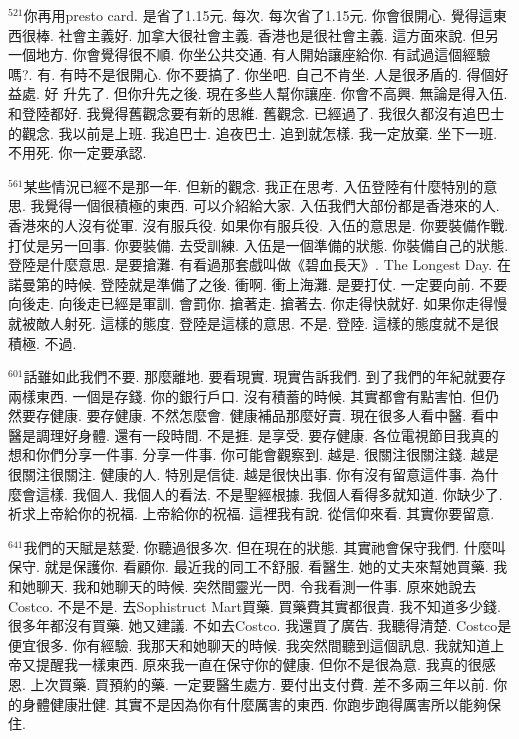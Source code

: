 \documentclass{book}
\begin{document}
$^{521}$你再用presto card.
是省了1.15元.
每次.
每次省了1.15元.
你會很開心.
覺得這東西很棒.
社會主義好.
加拿大很社會主義.
香港也是很社會主義.
這方面來說.
但另一個地方.
你會覺得很不順.
你坐公共交通.
有人開始讓座給你.
有試過這個經驗嗎?.
有.
有時不是很開心.
你不要搞了.
你坐吧.
自己不肯坐.
人是很矛盾的.
得個好益處.
好 升先了.
但你升先之後.
現在多些人幫你讓座.
你會不高興.
無論是得入伍.
和登陸都好.
我覺得舊觀念要有新的思維.
舊觀念.
已經過了.
我很久都沒有追巴士的觀念.
我以前是上班.
我追巴士.
追夜巴士.
追到就怎樣.
我一定放棄.
坐下一班.
不用死.
你一定要承認.

$^{561}$某些情況已經不是那一年.
但新的觀念.
我正在思考.
入伍登陸有什麼特別的意思.
我覺得一個很積極的東西.
可以介紹給大家.
入伍我們大部份都是香港來的人.
香港來的人沒有從軍.
沒有服兵役.
如果你有服兵役.
入伍的意思是.
你要裝備作戰.
打仗是另一回事.
你要裝備.
去受訓練.
入伍是一個準備的狀態.
你裝備自己的狀態.
登陸是什麼意思.
是要搶灘.
有看過那套戲叫做《碧血長天》.
The Longest Day.
在諾曼第的時候.
登陸就是準備了之後.
衝啊.
衝上海灘.
是要打仗.
一定要向前.
不要向後走.
向後走已經是軍訓.
會罰你.
搶著走.
搶著去.
你走得快就好.
如果你走得慢就被敵人射死.
這樣的態度.
登陸是這樣的意思.
不是.
登陸.
這樣的態度就不是很積極.
不過.

$^{601}$話雖如此我們不要.
那麼離地.
要看現實.
現實告訴我們.
到了我們的年紀就要存兩樣東西.
一個是存錢.
你的銀行戶口.
沒有積蓄的時候.
其實都會有點害怕.
但仍然要存健康.
要存健康.
不然怎麼會.
健康補品那麼好賣.
現在很多人看中醫.
看中醫是調理好身體.
還有一段時間.
不是捱.
是享受.
要存健康.
各位電視節目我真的想和你們分享一件事.
分享一件事.
你可能會觀察到.
越是.
很關注很關注錢.
越是很關注很關注.
健康的人.
特別是信徒.
越是很快出事.
你有沒有留意這件事.
為什麼會這樣.
我個人.
我個人的看法.
不是聖經根據.
我個人看得多就知道.
你缺少了.
祈求上帝給你的祝福.
上帝給你的祝福.
這裡我有說.
從信仰來看.
其實你要留意.

$^{641}$我們的天賦是慈愛.
你聽過很多次.
但在現在的狀態.
其實祂會保守我們.
什麼叫保守.
就是保護你.
看顧你.
最近我的同工不舒服.
看醫生.
她的丈夫來幫她買藥.
我和她聊天.
我和她聊天的時候.
突然間靈光一閃.
令我看測一件事.
原來她說去Costco.
不是不是.
去Sophistruct Mart買藥.
買藥費其實都很貴.
我不知道多少錢.
很多年都沒有買藥.
她又建議.
不如去Costco.
我還買了廣告.
我聽得清楚.
Costco是便宜很多.
你有經驗.
我那天和她聊天的時候.
我突然間聽到這個訊息.
我就知道上帝又提醒我一樣東西.
原來我一直在保守你的健康.
但你不是很為意.
我真的很感恩.
上次買藥.
買預約的藥.
一定要醫生處方.
要付出支付費.
差不多兩三年以前.
你的身體健康壯健.
其實不是因為你有什麼厲害的東西.
你跑步跑得厲害所以能夠保住.
\end{document}
